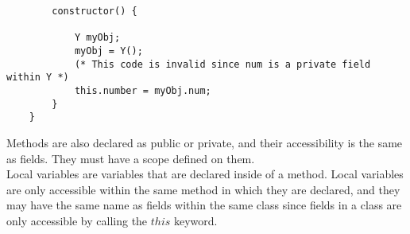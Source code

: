\begin{homeworkProblem}
\begin{verbatim}
		constructor() {
	
			Y myObj;
			myObj = Y();
			(* This code is invalid since num is a private field within Y *)
			this.number = myObj.num;  
		}
	}
	\end{verbatim}

	Methods are also declared as public or private, and their accessibility is the same as fields. They must have a scope defined on them. \\
	
	Local variables are variables that are declared inside of a method. Local variables are only accessible within the same method in which they are declared, and they may have the same name as fields within the same class since fields in a class are only accessible by calling the $this$ keyword.\\
		
\end{homeworkProblem}

